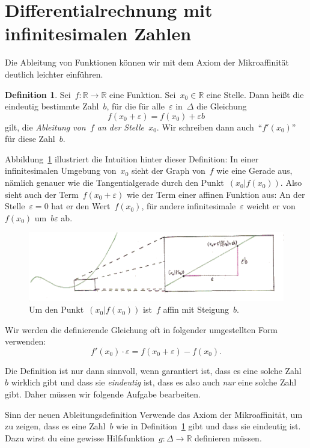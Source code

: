 \documentclass[twoside]{../zirkelblatt}
\newcommand{\RR}{\mathbb{R}}
\theoremstyle{definition}
\newtheorem{defn}{Definition}[section]
\theoremstyle{plain}
\theoremstyle{remark}
\begin{document}
\section{Differentialrechnung mit infinitesimalen Zahlen}

Die Ableitung von Funktionen können wir mit dem Axiom der Mikroaffinität
deutlich leichter einführen.

\begin{defn}\label{defn:sdg-ableitung}
Sei~$f : \RR \to \RR$ eine Funktion. Sei~$x_0 \in \RR$ eine Stelle.
Dann heißt die eindeutig bestimmte Zahl~$b$, für die für alle~$\varepsilon$
in~$\Delta$ die Gleichung
\[ f(x_0 + \varepsilon) = f(x_0) + \varepsilon b \]
gilt, die \emph{Ableitung von~$f$ an der Stelle~$x_0$}. Wir schreiben dann
auch~"`$f'(x_0)$"' für diese Zahl~$b$.\end{defn}

Abbildung~\ref{fig:ableitung-sdg} illustriert die Intuition hinter dieser
Definition: In einer infinitesimalen Umgebung von~$x_0$ sieht der Graph von~$f$
wie eine Gerade aus, nämlich genauer wie die Tangentialgerade durch den
Punkt~$(x_0|f(x_0))$. Also sieht auch der Term~$f(x_0 + \varepsilon)$ wie der
Term einer affinen Funktion aus: An der Stelle~$\varepsilon = 0$ hat er den
Wert~$f(x_0)$, für andere infinitesimale~$\varepsilon$ weicht er von~$f(x_0)$
um~$b \varepsilon$ ab.

\begin{figure}[b]
  \centering
  \includegraphics{sdg-ableitung}
  \caption{\label{fig:ableitung-sdg}Um den Punkt~$(x_0|f(x_0))$ ist~$f$ affin
  mit Steigung~$b$.}
\end{figure}

Wir werden die definierende Gleichung oft in folgender umgestellten Form
verwenden:
\[ f'(x_0) \cdot \varepsilon = f(x_0 + \varepsilon) - f(x_0). \]

Die Definition ist nur dann sinnvoll, wenn garantiert ist, dass es eine
solche Zahl~$b$ wirklich gibt und dass sie \emph{eindeutig} ist, dass es also
auch \emph{nur} eine solche Zahl gibt. Daher müssen wir folgende Aufgabe
bearbeiten.

\begin{aufgabeShaded}{Sinn der neuen Ableitungsdefinition}
Verwende das Axiom der Mikroaffinität, um zu zeigen, dass es eine Zahl~$b$ wie in
Definition~\ref{defn:sdg-ableitung} gibt und dass sie eindeutig ist. Dazu wirst
du eine gewisse Hilfsfunktion~$g : \Delta \to \RR$ definieren müssen.
\end{aufgabeShaded}
\end{document}

